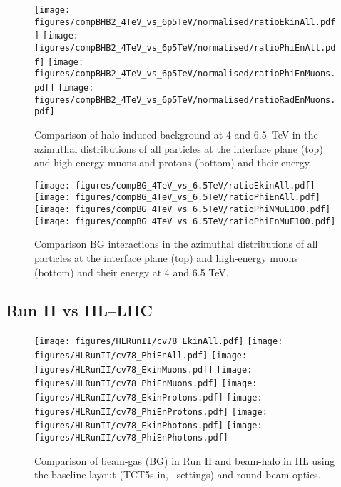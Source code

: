 \begin{figure}%
\begin{center}
  \texttt{[image: figures/compBHB2\_4TeV\_vs\_6p5TeV/normalised/ratioEkinAll.pdf]}
  \texttt{[image: figures/compBHB2\_4TeV\_vs\_6p5TeV/normalised/ratioPhiEnAll.pdf]}
  \texttt{[image: figures/compBHB2\_4TeV\_vs\_6p5TeV/normalised/ratioPhiEnMuons.pdf]}
  \texttt{[image: figures/compBHB2\_4TeV\_vs\_6p5TeV/normalised/ratioRadEnMuons.pdf]}
\end{center}
\vspace{-0.6cm}
 \caption{Comparison of halo induced background at 4 and 6.5~TeV in the azimuthal distributions of all particles at the interface plane (top) and high-energy muons and protons (bottom) and their energy.
  \label{compBHB2run1run2}}
\end{figure}



\begin{figure}%
\begin{center}
  \texttt{[image: figures/compBG\_4TeV\_vs\_6.5TeV/ratioEkinAll.pdf]}
  \texttt{[image: figures/compBG\_4TeV\_vs\_6.5TeV/ratioPhiEnAll.pdf]}
  \texttt{[image: figures/compBG\_4TeV\_vs\_6.5TeV/ratioPhiNMuE100.pdf]}
  \texttt{[image: figures/compBG\_4TeV\_vs\_6.5TeV/ratioPhiEnMuE100.pdf]}
\end{center}
\vspace{-0.6cm}
 \caption{Comparison BG interactions in the azimuthal distributions of all particles at the interface plane (top) and high-energy muons (bottom) and their energy at 4 and 6.5 TeV.
  \label{compBGrun1run2}}
\end{figure}


\subsection{Run II vs HL--LHC}

\begin{figure}
\begin{center}
  \texttt{[image: figures/HLRunII/cv78\_EkinAll.pdf]}
  \texttt{[image: figures/HLRunII/cv78\_PhiEnAll.pdf]}
  \texttt{[image: figures/HLRunII/cv78\_EkinMuons.pdf]}
  \texttt{[image: figures/HLRunII/cv78\_PhiEnMuons.pdf]}
  \texttt{[image: figures/HLRunII/cv78\_EkinProtons.pdf]}
  \texttt{[image: figures/HLRunII/cv78\_PhiEnProtons.pdf]}
  \texttt{[image: figures/HLRunII/cv78\_EkinPhotons.pdf]}
  \texttt{[image: figures/HLRunII/cv78\_PhiEnPhotons.pdf]}
\end{center}
\vspace{-0.6cm}
 \caption{Comparison of beam-gas (BG) in Run II and beam-halo in HL using the baseline layout (TCT5s in, \twosigmaret~settings) and round beam optics.
  \label{fig:hlrun2}}
\end{figure}
